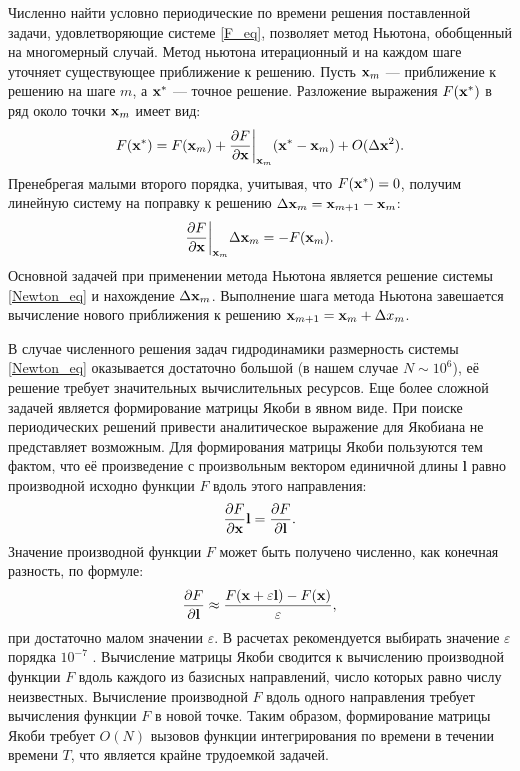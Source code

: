 Численно найти условно периодические по времени решения поставленной задачи, удовлетворяющие системе \eqref{F_eq}, позволяет метод Ньютона, обобщенный на многомерный случай. Метод ньютона итерационный и на каждом шаге уточняет существующее приближение к решению. Пусть $\mathbf{x}_m$ --- приближение к решению на шаге $m$, а $\mathbf{x}^*$ --- точное решение. Разложение выражения $F(\mathbf{x}^*)$ в ряд около точки $\mathbf{x}_m$ имеет вид:
\begin{equation}
F(\mathbf{x}^*) = F(\mathbf{x}_m) + \frac{\partial F}{\partial \mathbf{x}}\bigg|_{\mathbf{x}_m} (\mathbf{x}^* - \mathbf{x}_m) + O(\Delta \mathbf{x}^2). 
\end{equation}
Пренебрегая малыми второго порядка, учитывая, что $F(\mathbf{x}^*) = 0$, получим линейную систему на поправку к решению $\Delta \mathbf{x}_m = \mathbf{x}_{m+1} - \mathbf{x}_m$:
\begin{equation}\label{Newton_eq}
\frac{\partial F}{\partial \mathbf{x}}\bigg|_{\mathbf{x}_m} \Delta \mathbf{x}_m = - F(\mathbf{x}_m). 
\end{equation}
Основной задачей при применении метода Ньютона является решение системы \eqref{Newton_eq} и нахождение $\Delta \mathbf{x}_m$. Выполнение шага метода Ньютона завешается вычисление нового приближения к решению $\mathbf{x}_{m+1} = \mathbf{x}_m + \Delta x_m$. 


\def\l{\mathbf{l}}
В случае численного решения задач гидродинамики размерность системы \eqref{Newton_eq} оказывается достаточно большой (в нашем случае $N \sim 10^6$), её решение требует значительных вычислительных ресурсов. Еще более сложной задачей является формирование матрицы Якоби в явном виде. При поиске периодических решений привести аналитическое выражение для Якобиана не представляет возможным. Для формирования матрицы Якоби пользуются тем фактом, что её произведение с произвольным вектором единичной длины $\l$ равно производной исходно функции $F$ вдоль этого направления:
\begin{equation} \label{Jl_eq}
\pd{F}{\x} \l = \pd{F}{\l}. 
\end{equation}
Значение производной функции $F$ может быть получено численно, как конечная разность, по формуле:
\begin{equation}\label{fd_eq}
\pd{F}{\l} \approx \frac{F(\x + \varepsilon \l) - F(\x)}{\varepsilon},
\end{equation}
при достаточно малом значении $\varepsilon$. В расчетах рекомендуется выбирать значение $\varepsilon$ порядка $10^{-7}$ \cite{Viswanath2007}. Вычисление матрицы Якоби сводится к вычислению производной функции $F$ вдоль каждого из базисных направлений, число которых равно числу неизвестных. Вычисление производной $F$ вдоль одного направления требует вычисления функции $F$ в новой точке. Таким образом, формирование матрицы Якоби требует $O(N)$ вызовов функции интегрирования по времени в течении времени $T$, что является крайне трудоемкой задачей. 


